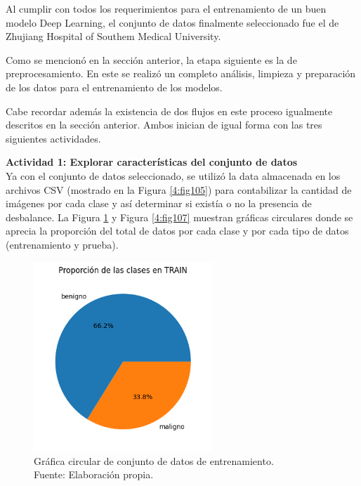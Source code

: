 Al cumplir con todos los requerimientos para el entrenamiento de un buen modelo Deep Learning, el conjunto de datos finalmente seleccionado fue el de Zhujiang Hospital of Southem Medical University.

Como se mencionó en la sección anterior, la etapa siguiente es la de preprocesamiento. En este se realizó un completo análisis, limpieza y preparación de los datos para el entrenamiento de los modelos.

Cabe recordar además la existencia de dos flujos en este proceso igualmente descritos en la sección anterior. Ambos inician de igual forma con las tres siguientes actividades.

\textbf{Actividad 1: Explorar características del conjunto de datos}
\\
Ya con el conjunto de datos seleccionado, se utilizó la data almacenada en los archivos CSV (mostrado en la Figura \ref{4:fig105}) para contabilizar la cantidad de imágenes por cada clase y así determinar si existía o no la presencia de desbalance. La Figura \ref{4:fig106} y Figura \ref{4:fig107} muestran gráficas circulares donde se aprecia la proporción del total de datos por cada clase y por cada tipo de datos (entrenamiento y prueba).

\begin{figure}[H]
	\begin{center}
		\includegraphics[width=0.60\textwidth]{4/figures/train_circular.png}
		\caption[Gráfica circular de conjunto de datos de entrenamiento]{Gráfica circular de conjunto de datos de entrenamiento. \\
		Fuente: Elaboración propia.}
		\label{4:fig106}
	\end{center}
\end{figure}

